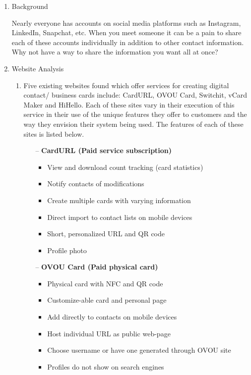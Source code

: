 \documentclass[12pt]{article}%
\begin{document}
\begin{enumerate}

    \item Background

    Nearly everyone has accounts on social media platforms such as Instagram, LinkedIn, Snapchat, etc. When you meet someone it can
    be a pain to share each of these accounts individually in addition to other contact information. Why not have a way to share the
    information you want all at once?


    \item Website Analysis
        \begin{enumerate}

            \item Five existing websites found which offer services for creating digital contact/ business cards include: CardURL, OVOU Card, Switchit, vCard Maker and HiHello. Each of these sites vary in their execution of this service in their use of the unique features they offer to customers and the way they envision their system being used. The features of each of these sites is listed below.

            \begin{enumerate}
                \item [--] \textbf{CardURL (Paid service subscription)}

                \begin{itemize}
                    \item View and download count tracking (card statistics)
                    \item Notify contacts of modifications
                    \item Create multiple cards with varying information
                    \item Direct import to contact lists on mobile devices
                    \item Short, personalized URL and QR code
                    \item Profile photo
                \end{itemize}

                \item [--] \textbf{OVOU Card (Paid physical card)}


                \begin{itemize}
                    \item Physical card with NFC and QR code
                    \item Customize-able card and personal page
                    \item Add directly to contacts on mobile devices
                    \item Host individual URL as public web-page
                    \item Choose username or have one generated through OVOU site
                    \item Profiles do not show on search engines
                \end{itemize}


\end{enumerate}
\end{enumerate}
\end{enumerate}
\end{document}
